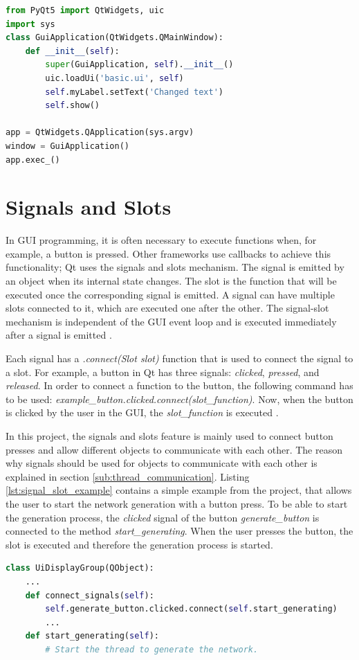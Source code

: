 \begin{lstlisting}[language=python, caption={Simple Qt GUI application}, label={lst:pyqt_gui}]
from PyQt5 import QtWidgets, uic
import sys
class GuiApplication(QtWidgets.QMainWindow):
    def __init__(self):
        super(GuiApplication, self).__init__()
        uic.loadUi('basic.ui', self)
        self.myLabel.setText('Changed text')
        self.show()

app = QtWidgets.QApplication(sys.argv)
window = GuiApplication()
app.exec_()
\end{lstlisting}

\section{Signals and Slots}
\label{sub:signals}

In GUI programming, it is often necessary to execute functions when, for example, a button is pressed. Other frameworks use callbacks to achieve this functionality; Qt uses the signals and slots mechanism. The signal is emitted by an object when its internal state changes. The slot is the function that will be executed once the corresponding signal is emitted. A signal can have multiple slots connected to it, which are executed one after the other. The signal-slot mechanism is independent of the GUI event loop and is executed immediately after a signal is emitted \cite{qt}.

Each signal has a \textit{.connect(Slot slot)} function that is used to connect the signal to a slot. For example, a button in Qt has three signals: \textit{clicked}, \textit{pressed}, and \textit{released}. In order to connect a function to the button, the following command has to be used: \textit{example\_button.clicked.connect(slot\_function)}. Now, when the button is clicked by the user in the GUI, the \textit{slot\_function} is executed \cite{pyqt}.

In this project, the signals and slots feature is mainly used to connect button presses and allow different objects to communicate with each other. The reason why signals should be used for objects to communicate with each other is explained in section \ref{sub:thread_communication}. Listing \ref{lst:signal_slot_example} contains a simple example from the project, that allows the user to start the network generation with a button press. To be able to start the generation process, the \textit{clicked} signal of the button \textit{generate\_button} is connected to the method \textit{start\_generating}. When the user presses the button, the slot is executed and therefore the generation process is started.
\begin{lstlisting}[language=python, caption={Signals and Slots example from the project}, label={lst:signal_slot_example}]
class UiDisplayGroup(QObject):
    ...
    def connect_signals(self):
        self.generate_button.clicked.connect(self.start_generating)
        ...
    def start_generating(self):
        # Start the thread to generate the network.
\end{lstlisting}


